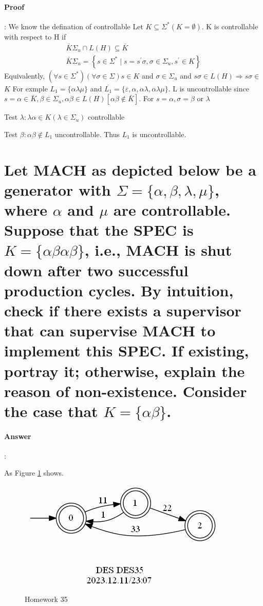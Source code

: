 \documentclass{article}
\begin{document}
\paragraph{Proof}:
We know the defination of controllable Let $K \subseteq \Sigma^*(K=\emptyset)$. K is controllable with respect to $\mathrm{H}$ if
$$
\begin{array}{r}
\bar{K} \Sigma_u \cap L(H) \subseteq \bar{K} \\
\bar{K} \Sigma_u=\left\{s \in \Sigma^* \mid s=s^{\prime} \sigma, \sigma \in \Sigma_u, s^{\prime} \in K\right\}
\end{array}
$$
Equivalently, $\left(\forall s \in \Sigma^*\right)(\forall \sigma \in \Sigma) s \in K$ and $\sigma \in \Sigma_u$ and $s \sigma \in L(H) \Rightarrow s \sigma \in$
$K$
For exmple $L_1=\{\alpha \lambda \mu\}$ and $\overline{L_1}=\{\varepsilon, \alpha, \alpha \lambda, \alpha \lambda \mu\}$. L is uncontrollable since $s=\alpha \in \bar{K}, \beta \in \Sigma_u, \alpha \beta \in L(H)[\alpha \beta \notin \bar{K}]$. For $s=\alpha, \sigma=\beta$ or $\lambda$

Test $\lambda: \lambda \alpha \in K\left(\lambda \in \Sigma_u\right)$ controllable


Test $\beta: \alpha \beta \notin L_1$ uncontrollable. Thus $L_1$ is uncontrollable.

\section{Let MACH as depicted below be a generator with $\Sigma = \{\alpha , \beta , \lambda , \mu \}$, where $\alpha$ and $\mu$ are controllable. Suppose that the SPEC is $K = \{\alpha\beta\alpha\beta\}$, i.e., MACH is shut down after two successful production cycles. By intuition, check if there exists a supervisor that can supervise MACH to implement this SPEC. If existing, portray it; otherwise, explain the reason of non-existence. Consider the case that $K = \{\alpha\beta\}$.}

\paragraph{Answer}:

As Figure \ref{fig:des35} shows.

\begin{figure}[h!]
  \centering
  \includegraphics{assets/DES35.jpg}
  \caption{Homework 35}
  \label{fig:des35}
\end{figure}
\end{document}
